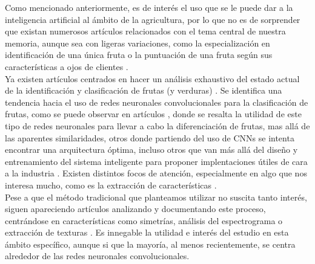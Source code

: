 \documentclass[a4paper, 12pt]{scrarticle}
\begin{document}
Como mencionado anteriormente, es de interés el uso que se le puede dar a la inteligencia artificial al ámbito de la agricultura, por lo que no es de sorprender que existan numerosos artículos relacionados con el tema central de nuestra memoria, aunque sea con ligeras variaciones, como la especialización en identificación de una única fruta \cite{agriculture12060756} o la puntuación de una fruta según sus características a ojos de clientes \cite{8488544}.\\

Ya existen artículos centrados en hacer un análisis exhaustivo del estado actual de la identificación y clasificación de frutas (y verduras) \cite{artbeh:Behera2020}. 
Se identifica una tendencia hacia el uso de redes neuronales convolucionales para la clasificación de frutas, como se puede observar en artículos \cite{artin:INDIRA2021}, donde se resalta la utilidad de este tipo de redes neuronales para llevar a cabo la diferenciación de frutas, mas allá de las aparentes similaridades, otros \cite{8729435} donde partiendo del uso de CNNs se intenta encontrar una arquitectura óptima, incluso otros que van más allá del diseño y entrenamiento del sistema inteligente para proponer implentaciones útiles de cara a la industria \cite{Yang2022}.
Existen distintos focos de atención, especialmente en algo que nos interesa mucho, como es la extracción de características \cite{8074025}.\\ 

Pese a que el método tradicional que planteamos utilizar no suscita tanto interés, siguen apareciendo artículos analizando y documentando este proceso, centrándose en características como simetrías, análisis del espectrograma o extracción de texturas \cite{10046437}.
Es innegable la utilidad e interés del estudio en esta ámbito específico, aunque si que la mayoría, al menos recientemente, se centra alrededor de las redes neuronales convolucionales.

\newpage

\nocite{*}


\end{document}
